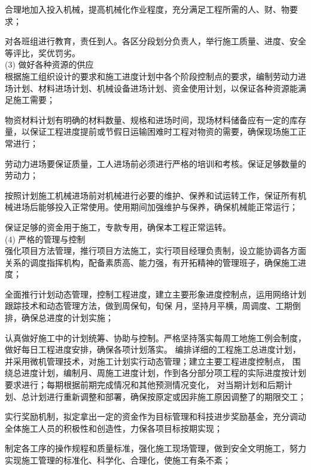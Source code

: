  合理地加入投入机械，提高机械化作业程度，充分满足工程所需的人、财、物要求；

 对各班组进行教育，责任到人。各区分段划分负责人，举行施工质量、进度、安全等评比，奖优罚劣。\\

(3) 做好各种资源的供应\\

 根据施工组织设计的要求和施工进度计划中各个阶段控制点的要求，编制劳动力进场计划、材料进场计划、机械设备进场计划、资金使用计划，以保证各种资源能满足施工需要；

 物资材料计划有明确的材料数量、规格和进场时间，现场材料储备应有一定的库存量，以保证工程进度提前或节假日运输困难时工程对物资的需要，确保现场施工正常进行；

 劳动力进场要保证质量，工人进场前必须进行严格的培训和考核。保证足够数量的劳动力；

 按照计划施工机械进场前对机械进行必要的维护、保养和试运转工作，保证所有机械进场后能够投入正常使用。使用期间加强维护与保养，确保机械能正常运行；

 保证足够的资金用于施工，专款专用，确保本工程正常运转。\\

(4) 严格的管理与控制\\

 强化项目方法管理，推行项目方法施工，实行项目经理负责制，设立能协调各方面关系的调度指挥机构，配备素质高、能力强，有开拓精神的管理班子，确保施工进度；

 全面推行计划动态管理，控制工程进度，建立主要形象进度控制点，运用网络计划跟踪技术和动态管理方法，做到周保旬，旬保
月，坚持月平横，周调度、工期倒排，确保总进度的计划实施；

 认真做好施工中的计划统筹、协助与控制。严格坚持落实每周工地施工例会制度，做好每日工程进度安排，确保各项计划落实。
编排详细的工程施工总进度计划，并采用微机管理技术，对施工计划实行动态管理；建立主要工程进度控制点，
围绕总进度计划，编制月、周施工进度计划，作到各分部分项工程的实际进度按计划要求进行；每期根据前期完成情况和其他预测情况变化，
对当期计划和后期计划、总计划进行重新调整和部署，确保按原定或因非施工原因调整了的期限交工；

 实行奖励机制，拟定拿出一定的资金作为目标管理和科技进步奖励基金，充分调动全体施工人员的积极性和创造性，力保各项目标按期实现；

 制定各工序的操作规程和质量标准，强化施工现场管理，做到安全文明施工，努力实现施工管理的标准化、科学化、合理化，使施工有条不紊；

